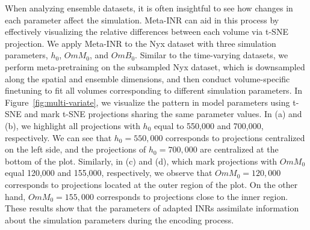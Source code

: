When analyzing ensemble datasets, it is often insightful to see how changes in each parameter affect the simulation. 
Meta-INR can aid in this process by effectively visualizing the relative differences between each volume via t-SNE projection. We apply Meta-INR to the Nyx dataset with three simulation parameters, $h_0$, $OmM_0$, and $OmB_0$. Similar to the time-varying datasets, we perform meta-pretraining on the subsampled Nyx dataset, which is downsampled along the spatial and ensemble dimensions, and then conduct volume-specific finetuning to fit all volumes corresponding to different simulation parameters. In Figure~\ref{fig:multi-variate}, we visualize the pattern in model parameters using t-SNE and mark t-SNE projections sharing the same parameter values. 
%
In (a) and (b), we highlight all projections with $h_0$ equal to 550,000 and 700,000, respectively. We can see that $h_0=550,000$ corresponds to projections centralized on the left side, and the projections of $h_0=700,000$ are centralized at the bottom of the plot.
%
Similarly, in (c) and (d), which mark projections with $OmM_0$ equal  120,000 and 155,000, respectively, we observe that $OmM_0=120,000$ corresponds to projections located at the outer region of the plot. On the other hand, $OmM_0=155,000$ corresponds to projections close to the inner region.
These results show that the parameters of adapted INRs assimilate information about the simulation parameters during the encoding process.
